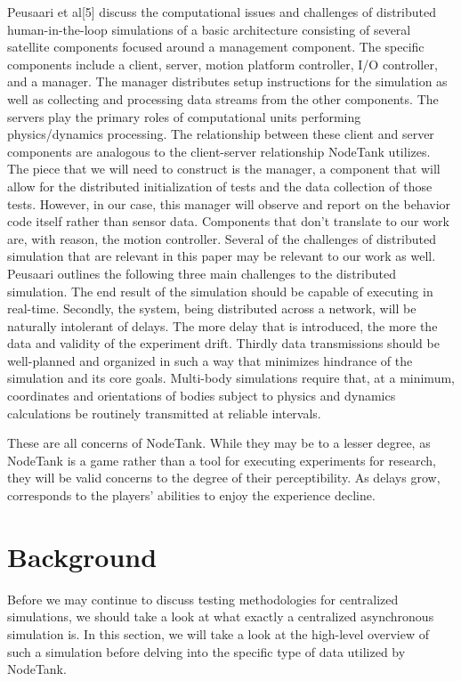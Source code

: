 \documentclass[conference]{IEEEtran}
\begin{document}
Peusaari et al[5] discuss the computational issues and challenges of distributed human-in-the-loop simulations of a basic architecture consisting of several satellite components 
focused around a management component. The specific components include a client, server, motion platform controller, I/O controller, and a manager. The manager distributes setup 
instructions for the simulation as well as collecting and processing data  streams from the other components. The servers play the primary roles of computational units performing 
physics/dynamics processing. The relationship between these client and server components are analogous to the client-server relationship NodeTank utilizes. The piece that we will 
need to construct is the manager, a component that will allow for the distributed initialization of tests and the data collection of those tests. However, in our case, this manager
will observe and report on the behavior code itself rather than sensor data. Components that don’t translate to our work are, with reason, the motion controller. Several of the 
challenges of distributed simulation that are relevant in this paper may be relevant to our work as well. Peusaari outlines the following three main challenges to the distributed 
simulation. The end result of the simulation should be capable of executing in real-time. Secondly, the system, being distributed across a network, will be naturally intolerant of 
delays. The more delay that is introduced, the more the data and validity of the experiment drift. Thirdly data transmissions should be well-planned and organized in such a way that 
minimizes hindrance of the simulation and its core goals. Multi-body simulations require that, at a minimum, coordinates and orientations of bodies subject to physics and dynamics 
calculations be routinely transmitted at reliable intervals.

These are all concerns of NodeTank. While they may be to a lesser degree, as NodeTank is a game rather than a tool for executing experiments for research, they will be valid concerns
 to the degree of their perceptibility. As delays grow, corresponds to the players’ abilities to enjoy the experience decline.

\section{Background}

Before we may continue to discuss testing methodologies for centralized simulations, we should take a look at what exactly a centralized asynchronous simulation is. 
In this section, we will take a look at the high-level overview of such a simulation before delving into the specific type of data utilized by NodeTank.
\end{document}
